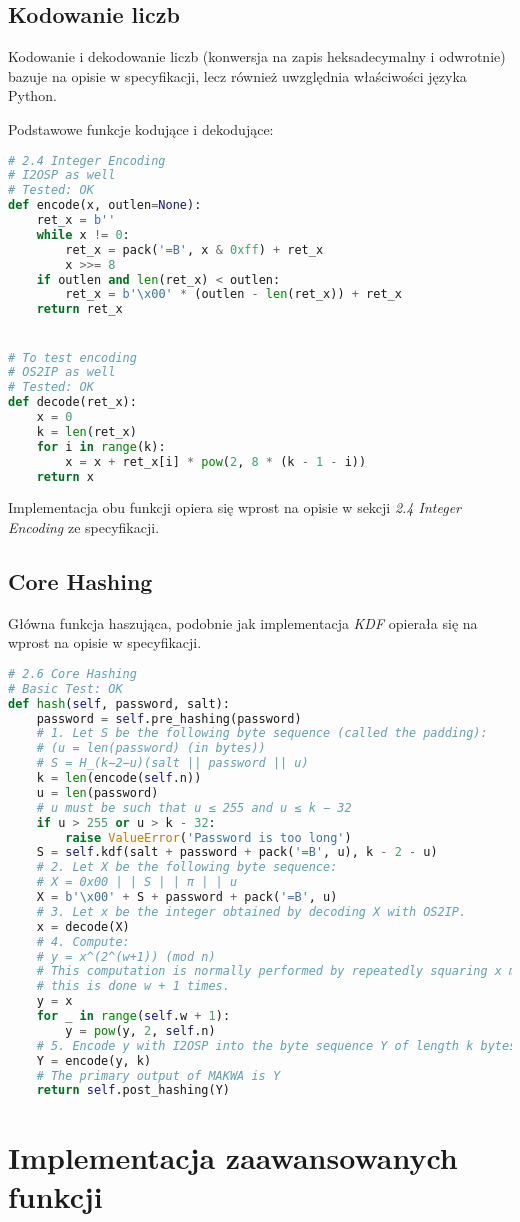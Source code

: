 \documentclass[a4paper,titleauthor]{mwart}
\begin{document}
\subsection{Kodowanie liczb}
Kodowanie i dekodowanie liczb (konwersja na zapis heksadecymalny i odwrotnie) bazuje na opisie w specyfikacji, lecz również uwzględnia właściwości języka Python.

Podstawowe funkcje kodujące i dekodujące:
\begin{lstlisting}[language=Python]
# 2.4 Integer Encoding
# I2OSP as well
# Tested: OK
def encode(x, outlen=None):
	ret_x = b''
	while x != 0:
		ret_x = pack('=B', x & 0xff) + ret_x
		x >>= 8
	if outlen and len(ret_x) < outlen:
		ret_x = b'\x00' * (outlen - len(ret_x)) + ret_x
	return ret_x


# To test encoding
# OS2IP as well
# Tested: OK
def decode(ret_x):
	x = 0
	k = len(ret_x)
	for i in range(k):
		x = x + ret_x[i] * pow(2, 8 * (k - 1 - i))
	return x
\end{lstlisting}
Implementacja obu funkcji opiera się wprost na opisie w sekcji \textit{2.4 Integer Encoding} ze specyfikacji.
\subsection{Core Hashing}
Główna funkcja haszująca, podobnie jak implementacja \textit{KDF} opierała się na wprost na opisie w specyfikacji.
\begin{lstlisting}[language=Python]
# 2.6 Core Hashing
# Basic Test: OK
def hash(self, password, salt):
	password = self.pre_hashing(password)
	# 1. Let S be the following byte sequence (called the padding):
	# (u = len(password) (in bytes))
	# S = H_(k−2−u)(salt || password || u)
	k = len(encode(self.n))
	u = len(password)
	# u must be such that u ≤ 255 and u ≤ k − 32
	if u > 255 or u > k - 32:
		raise ValueError('Password is too long')
	S = self.kdf(salt + password + pack('=B', u), k - 2 - u)
	# 2. Let X be the following byte sequence:
	# X = 0x00 | | S | | π | | u
	X = b'\x00' + S + password + pack('=B', u)
	# 3. Let x be the integer obtained by decoding X with OS2IP.
	x = decode(X)
	# 4. Compute:
	# y = x^(2^(w+1)) (mod n)
	# This computation is normally performed by repeatedly squaring x modulo n;
	# this is done w + 1 times.
	y = x
	for _ in range(self.w + 1):
		y = pow(y, 2, self.n)
	# 5. Encode y with I2OSP into the byte sequence Y of length k bytes.
	Y = encode(y, k)
	# The primary output of MAKWA is Y
	return self.post_hashing(Y)
\end{lstlisting}
\section{Implementacja zaawansowanych funkcji}
\end{document}
